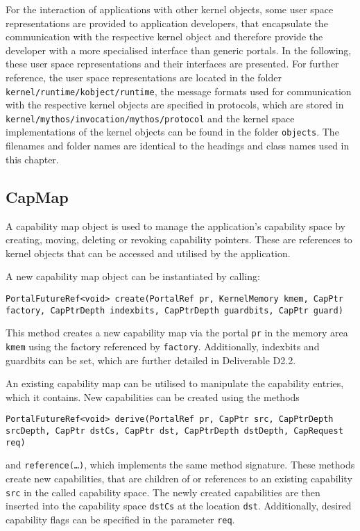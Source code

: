 For the interaction of applications with other kernel objects, some user space
representations are provided to application developers, that encapsulate the
communication with the respective kernel object and therefore provide the
developer with a more specialised interface than generic portals. In the
following, these user space representations and their interfaces are presented.
For further reference, the user space representations are located in the folder
\texttt{kernel/runtime/kobject/runtime}, the message formats used for communication
with the respective kernel objects are specified in protocols, which are stored
in \texttt{kernel/mythos/invocation/mythos/protocol} and the kernel space
implementations of the kernel objects can be found in the folder
\texttt{objects}. The filenames and folder names are identical to the headings and class names used in this chapter.

\subsection{CapMap}

A capability map object is used to manage the application's capability space by
creating, moving, deleting or revoking capability pointers. These are references
to kernel objects that can be accessed and utilised by the application.

A new capability map object can be instantiated by calling:
\lstset{language=c++,numbers=none}
\begin{lstlisting}
PortalFutureRef<void> create(PortalRef pr, KernelMemory kmem, CapPtr factory, CapPtrDepth indexbits, CapPtrDepth guardbits, CapPtr guard)
\end{lstlisting}

\noindent This method creates a new capability map via the portal \texttt{pr} in the
memory area \texttt{kmem} using the factory referenced by \texttt{factory}.
Additionally, indexbits and guardbits can be set, which are further detailed in
Deliverable D2.2.

An existing capability map can be utilised to manipulate the capability entries,
which it contains. New capabilities can be created using the methods
\lstset{language=c++,numbers=none}
\begin{lstlisting}
PortalFutureRef<void> derive(PortalRef pr, CapPtr src, CapPtrDepth srcDepth, CapPtr dstCs, CapPtr dst, CapPtrDepth dstDepth, CapRequest req)
\end{lstlisting}

\noindent and \texttt{reference(\ldots)}, which implements the same method
signature.  These methods create new capabilities, that are children of or
references to an existing capability \texttt{src} in the called capability
space. The newly created capabilities are then inserted into the capability
space \texttt{dstCs} at the location \texttt{dst}. Additionally, desired
capability flags can be specified in the parameter \texttt{req}.

